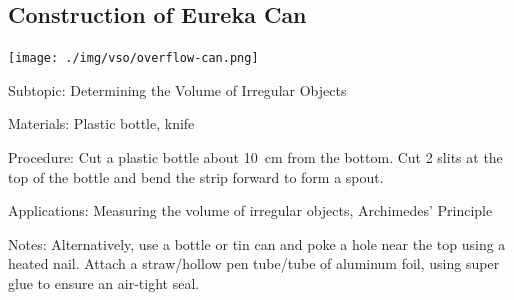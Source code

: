 
\subsection{Construction of Eureka Can}
\label{sub:eurekacan}

\begin{center}
\texttt{[image: ./img/vso/overflow-can.png]}
\end{center}

\begin{description*}
\item[Subtopic:]{Determining the Volume of Irregular Objects}
\item[Materials:]{Plastic bottle, knife}
\item[Procedure:]{Cut a plastic bottle about 10~cm from the bottom. Cut 2 slits at the top of the bottle and bend the strip forward to form a spout.}
\item[Applications:]{Measuring the volume of irregular objects, Archimedes' Principle}
\item[Notes:]{Alternatively, use a bottle or tin can and poke a hole near the top using a heated nail. Attach a straw/hollow pen tube/tube of aluminum foil, using super glue to ensure an air-tight seal.}
\end{description*}


